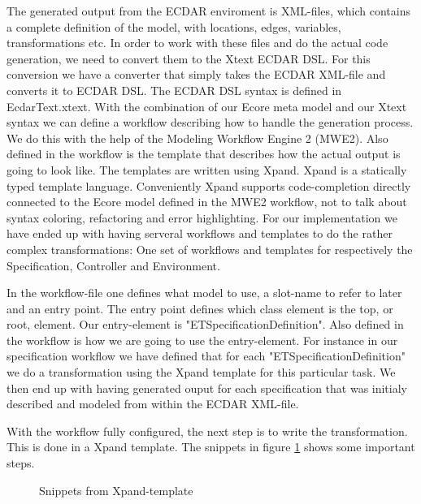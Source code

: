 The generated output from the ECDAR enviroment is XML-files, which contains a complete definition of the model, with locations, edges, variables, transformations etc. In order to work with these files and do the actual code generation, we need to convert them to the Xtext ECDAR DSL. For this conversion we have a converter that simply takes the ECDAR XML-file and converts it to ECDAR DSL. The ECDAR DSL syntax is defined in EcdarText.xtext. With the combination of our Ecore meta model and our Xtext syntax we can define a workflow describing how to handle the generation process. We do this with the help of the Modeling Workflow Engine 2 (MWE2). Also defined in the workflow is the template that describes how the actual output is going to look like. The templates are written using Xpand. Xpand is a statically typed template language. Conveniently Xpand supports code-completion directly connected to the Ecore model defined in the MWE2 workflow, not to talk about syntax coloring, refactoring and error highlighting. For our implementation we have ended up with having serveral workflows and templates to do the rather complex transformations: One set of workflows and templates for respectively the Specification, Controller and Environment.

In the workflow-file one defines what model to use, a slot-name to refer to later and an entry point. The entry point defines which class element is the top, or root, element. Our entry-element is "ETSpecificationDefinition". Also defined in the workflow is how we are going to use the entry-element. For instance in our specification workflow we have defined that for each "ETSpecificationDefinition" we do a transformation using the Xpand template for this particular task. We then end up with having generated ouput for each specification that was initialy described and modeled from within the ECDAR XML-file.

With the workflow fully configured, the next step is to write the transformation. This is done in a Xpand template. The snippets in figure \ref{xpand-example} shows some important steps.

\begin{figure}[t]



\caption{Snippets from Xpand-template \label{xpand-example}}
\end{figure}

